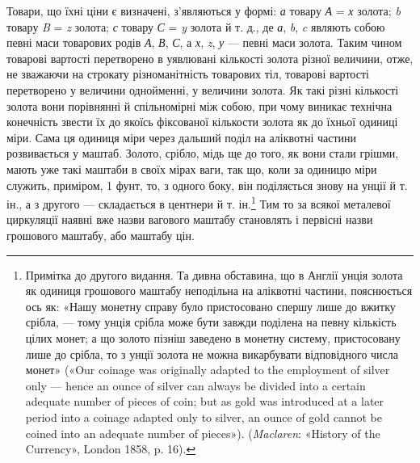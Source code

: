Товари, що їхні ціни є визначені, з’являються у формі: \emph{а}
товару \emph{А} = \emph{х} золота; \emph{b} товару \emph{B} = \emph{z} золота;
\emph{с} товару \emph{С} = \emph{y} золота й т. д.,
де \emph{а}, \emph{b}, \emph{c} являють собою певні маси товарових родів
\emph{А}, \emph{В}, \emph{С}, а \emph{х}, \emph{z}, \emph{у} — певні маси золота.
Таким чином товарові вартості перетворено в уявлювані кількості золота різної
величини, отже, не зважаючи на строкату різноманітність товарових тіл, товарові вартості перетворено
у величини однойменні, у величини золота. Як такі різні кількості золота вони порівнянні й
спільномірні між собою, при чому виникає технічна конечність звести їх до якоїсь фіксованої
кількости золота як до їхньої одиниці міри. Сама ця одиниця міри через дальший поділ на
аліквотні частини розвивається у маштаб. Золото, срібло, мідь ще до того, як вони стали грішми,
мають уже такі маштаби в своїх мірах ваги, так що, коли за одиницю міри служить, приміром, 1 фунт,
то, з одного боку, він поділяється знову на унції й т. ін., а з другого — складається в центнери й
т. ін.\footnote{
Примітка до другого видання. Та дивна обставина, що в Англії унція золота як одиниця грошового
маштабу неподільна на аліквотні частини, пояснюється ось як: «Нашу монетну справу було пристосовано
спершу лише до вжитку срібла, — тому унція срібла може бути завжди поділена на певну кількість цілих
монет; а що золото пізніш заведено в монетну систему, пристосовану лише до срібла, то з унції золота
не можна
викарбувати відповідного числа монет» («Our coinage was originally adapted to the employment of
silver only — hence an ounce of silver can always be divided into a certain adequate number of
pieces of coin; but as gold
was introduced at a later period into a coinage adapted only to silver, an
ounce of gold cannot be coined into an adequate number of pieces»). (\emph{Maclaren}:
«History of the Currency», London 1858, p. 16).
}
Тим то за всякої металевої циркуляції наявні вже назви вагового
маштабу становлять і первісні назви грошового маштабу,
або маштабу цін.

